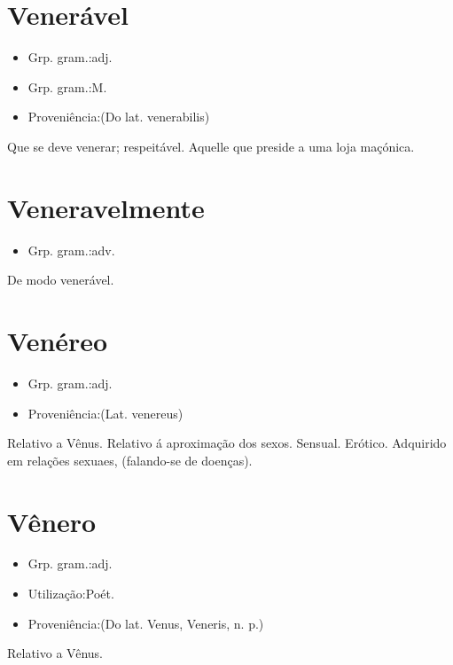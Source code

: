 \documentclass{article}
\begin{document}
\section{Venerável}
\begin{itemize}
\item {Grp. gram.:adj.}
\end{itemize}
\begin{itemize}
\item {Grp. gram.:M.}
\end{itemize}
\begin{itemize}
\item {Proveniência:(Do lat. \textunderscore venerabilis\textunderscore )}
\end{itemize}
Que se deve venerar; respeitável.
Aquelle que preside a uma loja maçónica.
\section{Veneravelmente}
\begin{itemize}
\item {Grp. gram.:adv.}
\end{itemize}
De modo venerável.
\section{Venéreo}
\begin{itemize}
\item {Grp. gram.:adj.}
\end{itemize}
\begin{itemize}
\item {Proveniência:(Lat. \textunderscore venereus\textunderscore )}
\end{itemize}
Relativo a Vênus.
Relativo á aproximação dos sexos.
Sensual.
Erótico.
Adquirido em relações sexuaes, (falando-se de doenças).
\section{Vênero}
\begin{itemize}
\item {Grp. gram.:adj.}
\end{itemize}
\begin{itemize}
\item {Utilização:Poét.}
\end{itemize}
\begin{itemize}
\item {Proveniência:(Do lat. \textunderscore Venus\textunderscore , \textunderscore Veneris\textunderscore , n. p.)}
\end{itemize}
Relativo a Vênus.
\end{document}
